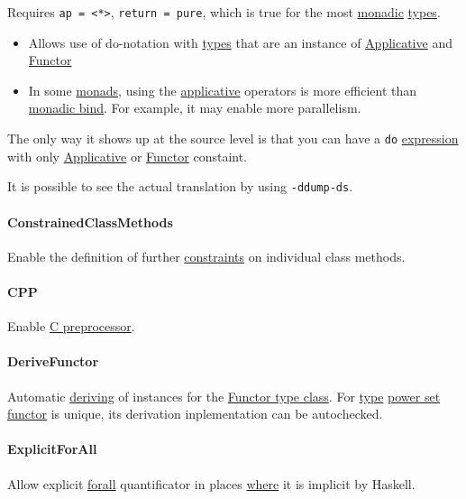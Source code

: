 \documentclass[a4paper,14pt,oneside]{book}
\begin{document}
Requires \texttt{ap = <*>}, \texttt{return = pure}, which is true for the most \hyperref[org748ccf9]{monadic} \hyperref[org40b6d66]{types}.
\begin{itemize}
\item Allows use of do-notation with \hyperref[org40b6d66]{types} that are an instance of \hyperref[orgffb5e0c]{Applicative} and \hyperref[org3bd25a7]{Functor}
\item In some \hyperref[org9cdb995]{monads}, using the \hyperref[orgffb5e0c]{applicative} operators is more efficient than \hyperref[orga96a10c]{monadic bind}. For example, it may enable more parallelism.
\end{itemize}

The only way it shows up at the source level is that you can have a \texttt{do} \hyperref[orgca36393]{expression} with only \hyperref[orgffb5e0c]{Applicative} or \hyperref[org3bd25a7]{Functor} constaint.

It is possible to see the actual translation by using \texttt{-ddump-ds}.

\paragraph{\label{org705e3ca}ConstrainedClassMethods}
\label{sec:orgb7cf7be}
Enable the definition of further \hyperref[org7ab0abf]{constraints} on individual class methods.

\paragraph{\label{orgfd29b0f}CPP}
\label{sec:orgf296808}
Enable \href{https://en.wikipedia.org/wiki/C\_preprocessor}{C preprocessor}.

\paragraph{\label{orgcf1e2c3}DeriveFunctor}
\label{sec:org59d2031}
Automatic \hyperref[org4fc1bae]{deriving} of instances for the \hyperref[org9241fac]{Functor type class}.
For \hyperref[org4e3af4c]{type} \hyperref[org6dc76ed]{power set} \hyperref[org3bd25a7]{functor} is unique, its derivation inplementation can be autochecked.

\paragraph{\label{org20c7acc}ExplicitForAll}
\label{sec:orga41bb5b}
Allow explicit \hyperref[org4498138]{forall} quantificator in places \hyperref[org549a251]{where} it is implicit by Haskell.
\end{document}
